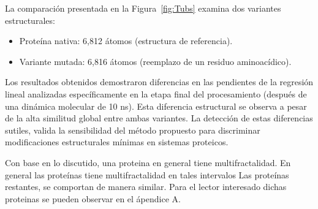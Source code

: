 	
	La comparaci\'{o}n presentada en la Figura~\ref{fig:Tubs} examina dos variantes estructurales:
	\begin{itemize}
		\item Prote\'{i}na nativa: 6,812 \'{a}tomos (estructura de referencia).
		\item Variante mutada: 6,816 \'{a}tomos (reemplazo de un residuo aminoac\'{i}dico).
	\end{itemize}
	
	Los resultados obtenidos demostraron diferencias en las pendientes de la regresi\'{o}n lineal analizadas espec\'{i}ficamente en la etapa final del procesamiento (despu\'{e}s de una din\'{a}mica molecular de 10 ns). Esta diferencia estructural se observa a pesar de la alta similitud global entre ambas variantes.
	La detecci\'{o}n de estas diferencias sutiles, valida la sensibilidad del m\'{e}todo propuesto para discriminar modificaciones estructurales m\'{i}nimas en sistemas proteicos.
	
	Con base en lo discutido, una proteina en general tiene multifractalidad.
	En general las prote\'{i}nas tiene multifractalidad en tales intervalos
	Las prote\'{i}nas restantes, se comportan de manera similar. Para el lector interesado dichas proteinas se pueden observar en el \'{a}pendice A.